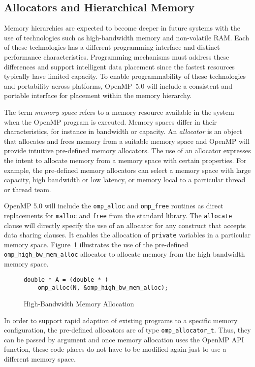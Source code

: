 \subsection{Allocators and Hierarchical Memory}
\label{sub:allocators_and_hierarchical_memory}

Memory hierarchies are expected to become deeper in future systems with the
use of technologies such as high-bandwidth memory and non-volatile RAM. Each 
of these technologies has a different programming interface and distinct
performance characteristics. Programming mechanisms must address these 
differences and support intelligent data placement since the fastest resources
typically have limited capacity. To enable programmability of these 
technologies and portability across platforms, OpenMP~5.0 will include a 
consistent and portable interface for placement within the memory hierarchy.

The term \emph{memory space} refers to a memory resource available in the
system when the OpenMP program is executed. Memory spaces differ in their 
characteristics, for instance in bandwidth or capacity. An \emph{allocator} 
is an object that allocates and frees memory from a suitable memory space 
and OpenMP will provide intuitive pre-defined memory allocators. The use of 
an allocator expresses the intent to allocate memory from a memory space 
with certain properties. For example, the pre-defined memory allocators 
can select a memory space with large capacity, high bandwidth or low latency, 
or memory local to a particular thread or thread team.

OpenMP 5.0 will include the \texttt{omp\_alloc} and \texttt{omp\_free} 
routines as direct replacements for \texttt{malloc} and \texttt{free} from 
the standard library. The \texttt{allocate} clause will directly specify 
the use of an allocator for any construct that accepts data sharing clauses.
It enables the allocation of \texttt{private} variables in a particular memory
space. Figure~\ref{fig:allocators} illustrates the use of the pre-defined
\texttt{omp\_high\_bw\_mem\_alloc} allocator to allocate memory from the 
high bandwidth memory space.

\begin{figure}
\begin{verbatim}
double * A = (double * ) 
    omp_alloc(N, &omp_high_bw_mem_alloc);
\end{verbatim}
\caption{High-Bandwidth Memory Allocation\label{fig:allocators}}
\end{figure}

In order to support rapid adaption of existing programs to a specific memory 
configuration, the pre-defined allocators are of type 
\texttt{omp\_allocator\_t}. Thus, they can be passed by argument and once 
memory allocation uses the OpenMP API function, these code places do not 
have to be modified again just to use a different memory space.
